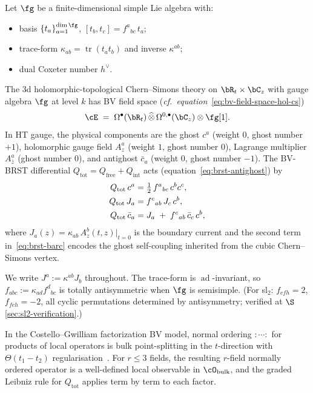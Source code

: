 \begin{definition}
\label{def:cfg-bv-complex}
Let $\fg$ be a finite-dimensional simple Lie algebra with:
\begin{itemize}
 \item basis $\{t_a\}_{a=1}^{\dim\fg}$, $[t_b,t_c] = f^a{}_{bc}\,t_a$;
 \item trace-form $\kappa_{ab} = \operatorname{tr}(t_a t_b)$ and
 inverse $\kappa^{ab}$;
 \item dual Coxeter number $h^\vee$.
\end{itemize}
The $3$d holomorphic-topological Chern--Simons theory on
$\bR_t \times \bC_z$ with gauge algebra $\fg$ at level $k$ has BV
field space (\emph{cf.\ equation}~\eqref{eq:bv-field-space-hol-cs})
\[
 \cE \;=\; \Omega^\bullet(\bR_t)\,\widehat\otimes\,
 \Omega^{0,\bullet}(\bC_z) \otimes \fg[1].
\]
In HT gauge, the physical components are the ghost $c^a$
(weight $0$, ghost number $+1$), holomorphic gauge field $A_z^a$
(weight $1$, ghost number $0$), Lagrange multiplier
$A_{\bar z}^a$ (ghost number $0$), and antighost $\bar c_a$
(weight $0$, ghost number $-1$). The BV-BRST differential
$Q_{\mathrm{tot}} = Q_{\mathrm{free}} + Q_{\mathrm{int}}$ acts
(equation~\eqref{eq:brst-antighost}) by
\begin{align}
 Q_{\mathrm{tot}}\,c^a
 &= \tfrac{1}{2}\,f^a{}_{bc}\,c^b c^c, \notag\\
 Q_{\mathrm{tot}}\,J_a
 &= f^c{}_{ab}\,J_c\,c^b, \label{eq:brst-J}\\
 Q_{\mathrm{tot}}\,\bar c_a
 &= J_a \;+\; f^c{}_{ab}\,\bar c_c\,c^b, \label{eq:brst-barc}
\end{align}
where $J_a(z) = \kappa_{ab}\,A_z^b(t,z)|_{t=0}$ is the boundary
current and the second term in~\eqref{eq:brst-barc} encodes the
ghost self-coupling inherited from the cubic Chern--Simons vertex.
\end{definition}

\begin{remark}
\label{rem:raised-index}
We write $J^a := \kappa^{ab} J_b$ throughout. The trace-form is
$\operatorname{ad}$-invariant, so
$f_{abc} := \kappa_{ad} f^d{}_{bc}$ is totally antisymmetric
when $\fg$ is semisimple. (For sl$_2$: $f_{efh} = 2$,
$f_{feh}=-2$, all cyclic permutations determined by
antisymmetry; verified at $\S$\ref{sec:sl2-verification}.)
\end{remark}

\begin{definition}
\label{def:no-cfg}
In the Costello--Gwilliam factorization BV model, normal ordering
${:}\cdots{:}$ for products of local operators is bulk
point-splitting in the $t$-direction with
$\Theta(t_1 - t_2)$ regularisation~\cite[Ch.~5]{CG1}. For
$r \le 3$ fields, the resulting $r$-field normally ordered
operator is a well-defined local observable in
$\cO_{\mathrm{bulk}}$, and the graded Leibniz rule
for $Q_{\mathrm{tot}}$ applies term by term to each factor.
\end{definition}

